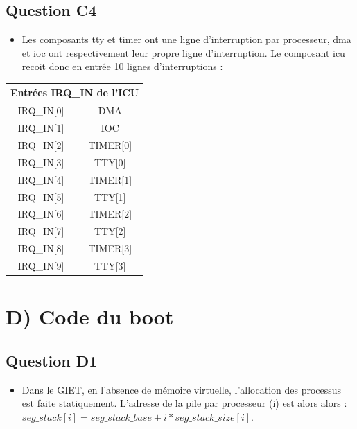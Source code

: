 \documentclass[10pt]{article}
\begin{document}
\subsection{Question C4}
\begin{minipage}{.5\textwidth}
  \begin{itemize}
    \item Les composants tty et timer ont une ligne d'interruption par processeur,
    dma et ioc ont respectivement leur propre ligne d'interruption. Le composant
    icu recoit donc en entrée 10 lignes d'interruptions :\\[1ex]
  \end{itemize}
\end{minipage}
\quad\quad
\begin{minipage}{.5\textwidth}
  \begin{tabular}{|c|c|}
    \hline
    \multicolumn{2}{|c|}{Entrées IRQ\_IN de l'ICU} \\ \hline
    IRQ\_IN[0] & DMA \\ \hline
    IRQ\_IN[1] & IOC \\ \hline
    IRQ\_IN[2] & TIMER[0] \\ \hline
    IRQ\_IN[3] & TTY[0] \\ \hline
    IRQ\_IN[4] & TIMER[1] \\ \hline
    IRQ\_IN[5] & TTY[1] \\ \hline
    IRQ\_IN[6] & TIMER[2] \\ \hline
    IRQ\_IN[7] & TTY[2] \\ \hline
    IRQ\_IN[8] & TIMER[3] \\ \hline
    IRQ\_IN[9] & TTY[3] \\ \hline
  \end{tabular}
\end{minipage}

\section{D) Code du boot}
\subsection{Question D1}
\begin{itemize}
  \item Dans le GIET, en l'absence de mémoire virtuelle, l'allocation des
  processus est faite statiquement. L'adresse de la pile par processeur (i) est
  alors alors : $seg\_stack[i] = seg\_stack\_base + i*seg\_stack\_size[i]$.
\end{itemize}
\end{document}
